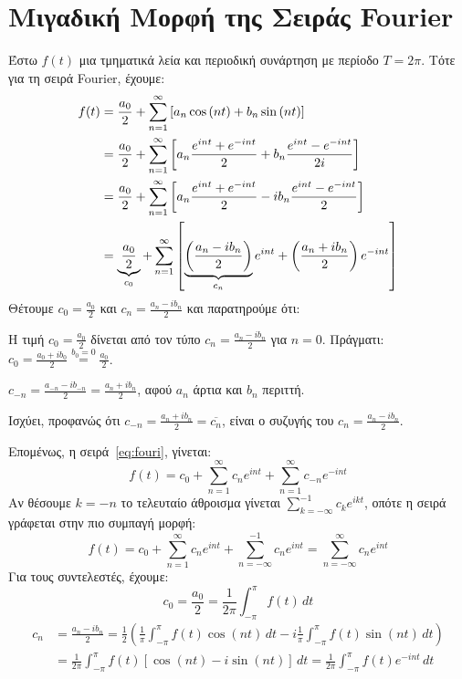 \section{Μιγαδική Μορφή της Σειράς Fourier}



Έστω $f(t)$ μια τμηματικά λεία και περιοδική συνάρτηση με περίοδο $ T=2 \pi $. Τότε 
για τη σειρά Fourier, έχουμε:
\begin{align}
  \label{eq:fouri}
  f(t) &= \frac{a_{0}}{2} + \sum_{n=1}^{\infty} \left[a_{n} \cos{(nt)} + b_{n} \sin{(nt)}\right] \notag \\
       &= \frac{a_{0}}{2} + \sum_{n=1}^{\infty} \left[a_{n} \frac{e^{int}+e^{-int}}{2} + b_{n} \frac{e^{int}-e^{-int}}{2i} \right] \notag \\
       &= \frac{a_{0}}{2} + \sum_{n=1}^{\infty} \left[a_{n} \frac{e^{int}+e^{-int}}{2} - i b_{n} \frac{e^{int}-e^{-int}}{2}\right] \notag \\
       &= \underbrace{\frac{a_{0}}{2}}_{c_{0}} + \sum_{n=1}^{\infty} \left[\underbrace{\left(\frac{a_{n}-ib_{n}}{2}\right)}_{c_{n}}e^{int} +
       \left(\frac{a_{n}+ib_{n}}{2}\right) e^{-int}\right]
\end{align}
Θέτουμε $ c_{0} = \frac{a_{0}}{2} $ και $ c_{n} = \frac{a_{n}-ib_{n}}{2} $ και
παρατηρούμε ότι:
\begin{myitemize}
  \item Η τιμή $ c_{0} = \frac{a_{0}}{2} $ δίνεται από τον τύπο $ c_{n} =
    \frac{a_{n}- ib_{n}}{2} $ για $ n=0 $. Πράγματι: 
    $ c_{0} = \frac{a_{0}+ib_{0}}{2} \overset{b_{0}=0}{=} \frac{a_{0}}{2}$.
  \item 
    $ c_{-n} = \frac{a_{-n}-ib_{-n}}{2} = \frac{a_{n}+ib_{n}}{2} $, αφού 
    $ a_{n} $ άρτια και $ b_{n} $ περιττή.
  \item Ισχύει, προφανώς ότι $ c_{-n} = \frac{a_{n}+ib_{n}}{2} = \overline{c_{n}}
    $, είναι ο συζυγής του $ c_{n} = \frac{a_{n}-i b_{n}}{2} $.
\end{myitemize}
Επομένως, η σειρά~\eqref{eq:fouri}, γίνεται:
\[
  f(t) = c_{0} + \sum_{n=1}^{\infty} c_{n} e^{int} + \sum_{n=1}^{\infty} c_{-n}
  e^{-int} 
\] 
Αν θέσουμε $ k=-n $ το τελευταίο άθροισμα γίνεται $ \sum_{k=-\infty}^{-1} c_{k}
e^{ikt} $, οπότε η σειρά γράφεται στην πιο συμπαγή μορφή:
\[
  f(t) = c_{0} + \sum_{n=1}^{\infty} c_{n} e^{int} + \sum_{n=-\infty}^{-1} c_{n}
  e^{int} = \sum_{n=- \infty}^{\infty} c_{n} e^{int}
\]
Για τους συντελεστές, έχουμε:
\[
  c_{0} = \frac{a_{0}}{2} = \frac{1}{2\pi} \int _{- \pi }^{\pi} f(t) \,{dt}
\] 
\begin{align*}
  c_{n} &= \frac{a_{n}-ib_{n}}{2} = \frac{1}{2} 
  \left(\frac{1}{\pi} \int _{- \pi }^{\pi } f(t) \cos{(nt)} \,{dt} - i
  \frac{1}{\pi} \int _{- \pi }^{\pi } f(t) \sin{(nt)} \,{dt}  \right) \\ 
        &= \frac{1}{2 \pi} \int _{- \pi }^{\pi} f(t) [\cos{(nt)} - i \sin{(nt)}] 
        \,{dt} = \frac{1}{2 \pi} \int _{- \pi }^{\pi } f(t) e^{-int} \,{dt}
\end{align*} 
